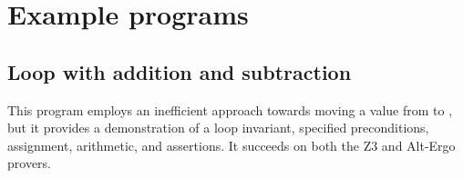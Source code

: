 \section{Example programs} %

\subsection{Loop with addition and subtraction}
This program employs an inefficient approach towards moving a value from  to ,
but it provides a demonstration of
a loop invariant, specified preconditions, assignment, arithmetic, and assertions.
It succeeds on both the Z3 and Alt-Ergo provers.


